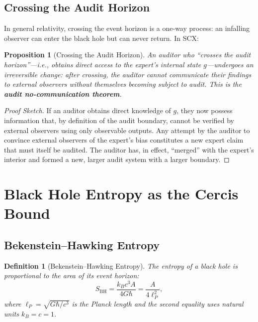 \documentclass[12pt,a4paper]{article}
\newtheorem{proposition}[theorem]{Proposition}
\newtheorem{definition}[theorem]{Definition}
\theoremstyle{remark}
\newcommand{\SCX}{\textsf{SCX}}
\begin{document}
\subsection{Crossing the Audit Horizon}

In general relativity, crossing the event horizon is a one-way process: an infalling observer can enter the black hole but can never return. In \SCX{}:

\begin{proposition}[Crossing the Audit Horizon]
\label{prop:crossing}
An auditor who ``crosses the audit horizon''---i.e., obtains direct access to the expert's internal state $g$---undergoes an irreversible change: after crossing, the auditor cannot communicate their findings to external observers without themselves becoming subject to audit. This is the \textbf{audit no-communication theorem}.
\end{proposition}

\begin{proof}[Proof Sketch]
If an auditor obtains direct knowledge of $g$, they now possess information that, by definition of the audit boundary, cannot be verified by external observers using only observable outputs. Any attempt by the auditor to convince external observers of the expert's bias constitutes a new expert claim that must itself be audited. The auditor has, in effect, ``merged'' with the expert's interior and formed a new, larger audit system with a larger boundary.
\end{proof}


\section{Black Hole Entropy as the Cercis Bound}
\label{sec:cercis_bound}

\subsection{Bekenstein--Hawking Entropy}

\begin{definition}[Bekenstein--Hawking Entropy]
\label{def:bh_entropy}
The entropy of a black hole is proportional to the area of its event horizon:
\begin{equation}
  \label{eq:bh_entropy}
  S_{\text{BH}} = \frac{k_B c^3 A}{4 G \hbar} = \frac{A}{4\ell_P^2},
\end{equation}
where $\ell_P = \sqrt{G\hbar / c^3}$ is the Planck length and the second equality uses natural units $k_B = c = 1$.
\end{definition}
\end{document}
